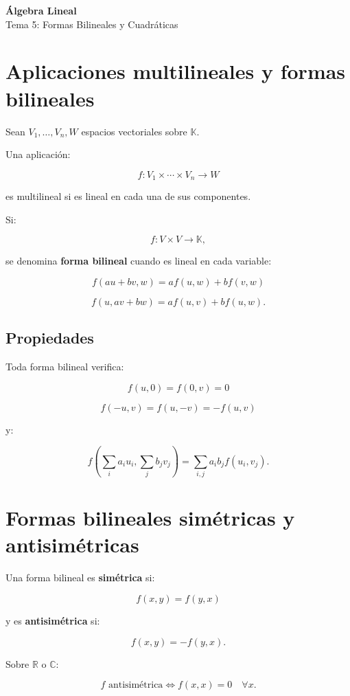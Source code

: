 \documentclass[11pt,a4paper]{article}
\newcommand{\R}{\mathbb{R}}
\newcommand{\C}{\mathbb{C}}
\newcommand{\K}{\mathbb{K}}
\begin{document}
\begin{center}
{\LARGE\bfseries Álgebra Lineal}\\[0.4em]
{\Large Tema 5: Formas Bilineales y Cuadráticas}
\end{center}

\tableofcontents
\newpage

\section{Aplicaciones multilineales y formas bilineales}

Sean $V_1,\ldots,V_n,W$ espacios vectoriales sobre $\K$.

Una aplicación:

\[
f:V_1\times\cdots\times V_n\longrightarrow W
\]

es multilineal si es lineal en cada una de sus componentes.

Si:

\[
f:V\times V\longrightarrow\K,
\]

se denomina \textbf{forma bilineal} cuando es lineal en cada variable:

\[
f(au+bv,w)=af(u,w)+bf(v,w)
\]

\[
f(u,av+bw)=af(u,v)+bf(u,w).
\]

\subsection{Propiedades}

Toda forma bilineal verifica:

\[
f(u,0)=f(0,v)=0
\]

\[
f(-u,v)=f(u,-v)=-f(u,v)
\]

y:

\[
f\left(\sum_i a_i u_i,\sum_j b_jv_j\right)
=
\sum_{i,j}a_ib_jf(u_i,v_j).
\]

\section{Formas bilineales simétricas y antisimétricas}

Una forma bilineal es \textbf{simétrica} si:

\[
\boxed{
f(x,y)=f(y,x)
}
\]

y es \textbf{antisimétrica} si:

\[
\boxed{
f(x,y)=-f(y,x).
}
\]

Sobre $\R$ o $\C$:

\[
\boxed{
f\text{ antisimétrica}
\iff
f(x,x)=0\quad\forall x.
}
\]
\end{document}
